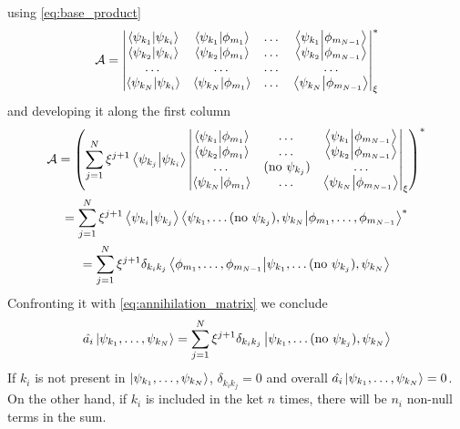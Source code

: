 using \cref{eq:base_product}
\begin{equation}
    \mathcal{A} = \begin{vmatrix}
        \braket{\psi_{k_1}}{\psi_{k_i}} & \braket{\psi_{k_1}}{\phi_{m_1}} & \dots & \braket{\psi_{k_1}}{\phi_{m_{N-1}} } \\
        \braket{\psi_{k_2}}{\psi_{k_i}} & \braket{\psi_{k_2}}{\phi_{m_1}} & \dots & \braket{\psi_{k_2}}{\phi_{m_{N-1}}}  \\
        \dots                           & \dots                           & \dots & \dots                                \\
        \braket{\psi_{k_N}}{\psi_{k_i}} & \braket{\psi_{k_N}}{\phi_{m_1}} & \dots & \braket{\psi_{k_N}}{\phi_{m_{N-1}}}  \\
    \end{vmatrix}_\xi^*
\end{equation}
and developing it along the first column
\begin{multline}
    \mathcal{A} = \left( \sum_{j=1}^N \xi^{j+1} \braket{\psi_{k_j}}{\psi_{k_i}}
    \begin{vmatrix}
        \braket{\psi_{k_1}}{\phi_{m_1}} & \dots                   & \braket{\psi_{k_1}}{\phi_{m_{N-1}} } \\
        \braket{\psi_{k_2}}{\phi_{m_1}} & \dots                   & \braket{\psi_{k_2}}{\phi_{m_{N-1}}}  \\
        \dots                           & (\text{no } \psi_{k_j}) & \dots                                \\
        \braket{\psi_{k_N}}{\phi_{m_1}} & \dots                   & \braket{\psi_{k_N}}{\phi_{m_{N-1}}}  \\
    \end{vmatrix}_\xi
    \right)^*
    \\ = \sum_{j=1}^N \xi^{j+1} \braket{\psi_{k_i}}{\psi_{k_j}}  \bra{\psi_{k_1}, \dots (\text{no } \psi_{k_j}), \psi_{k_N}} \ket{\phi_{m_1}, \dots, \phi_{m_{N-1}}}^*
    \\ = \sum_{j=1}^N \xi^{j+1} \delta_{k_ik_j}  \bra{\phi_{m_1}, \dots, \phi_{m_{N-1}}} \ket{\psi_{k_1}, \dots (\text{no } \psi_{k_j}), \psi_{k_N}}
\end{multline}
Confronting it with \cref{eq:annihilation_matrix} we conclude
\begin{equation} \label{eq:annihilation_operator}
    \hat{a_i} \ket{\psi_{k_1}, \dots, \psi_{k_N}} = \sum_{j=1}^N \xi^{j+1} \delta_{k_ik_j} \ket{\psi_{k_1}, \dots (\text{no } \psi_{k_j}), \psi_{k_N}}
\end{equation}
If $k_i$ is not present in $\ket{\psi_{k_1}, \dots, \psi_{k_N}}$, $\delta_{k_ik_j} = 0$ and overall $ \hat{a_i} \ket{\psi_{k_1}, \dots, \psi_{k_N}} = 0$. On the other hand, if $k_i$ is included in the ket $n$ times, there will be $n_i$ non-null terms in the sum.

